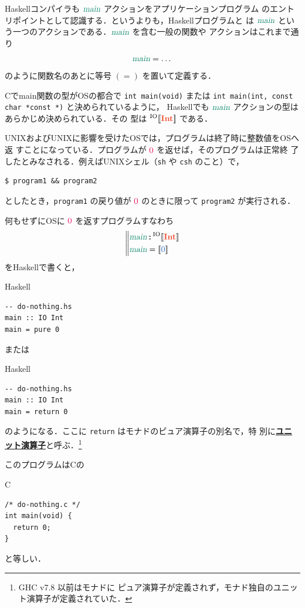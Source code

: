 \documentclass[a5paper,twoside,fleqn,draft]{jsbook}
\def\[{[\![}
\def\]{]\!]}
\def\constantColor{WildStrawberry}
\def\varColor{NavyBlue}
\def\actionColor{PineGreen}
\def\typeColor{RedOrange}
\newcommand{\programminglanguage}[1]{\textsf{#1}}
\newcommand{\clang}{\programminglanguage{C}}
\newcommand{\haskell}{\programminglanguage{Haskell}}
\newcommand{\keyword}[1]{{\underline{\textbf{#1}}}}
\newcommand{\code}[1]{\texttt{#1}}
\newcommand{\filename}[1]{\texttt{#1}}
\newenvironment{ccode}{\begin{itembox}[r]{\clang}}{\end{itembox}}
\newenvironment{haskellcode}{\begin{itembox}[r]{\haskell}}{\end{itembox}}
\newcommand{\mBrace}{\Vert}
\newcommand{\mConstant}[1]{\textcolor{\constantColor}{#1}}
\newcommand{\mZeroNumber}{{\mConstant{0}}}
\newcommand{\mVar}[1]{\textcolor{\varColor}{#1}}
\newcommand{\mActionLong}[1]{\textcolor{\actionColor}{\textsl{#1}}}
\DeclareMathOperator{\mMain}{\mActionLong{main}}
\DeclareMathOperator{\mIn}{{:\!:}}
\newcommand{\mType}[1]{\textcolor{\typeColor}{\mathbf{#1}}}
\newcommand{\mIntType}{\mType{Int}}
\newcommand{\mTypeAssemble}[2]{{}^\mathrm{#1}\[\mType{#2}\]}
\newcommand{\mIOType}[1]{\mTypeAssemble{IO}{#1}}
\newcommand{\mIOIntType}{\mIOType{\mIntType}}
\newcommand{\mPureWith}[1]{\[\mVar{#1}\]}
\begin{document}
\haskell コンパイラも $\mMain$ アクションをアプリケーションプログラム
のエントリポイントとして認識する．というよりも，\haskell プログラムと
は $\mMain$ という一つのアクションである．$\mMain$ を含む一般の関数や
アクションはこれまで通り
\begin{equation}
\mMain=\dots
\end{equation}
のように関数名のあとに等号 $(=)$ を置いて定義する．

\clang でmain関数の型がOSの都合で \code{int main(void)} または
\code{int main(int, const char *const *)} と決められているように，
\haskell でも $\mMain$ アクションの型はあらかじめ決められている．その
型は $\mIOIntType$ である．

UNIXおよびUNIXに影響を受けたOSでは，プログラムは終了時に整数値をOSへ返
すことになっている．プログラムが $\mZeroNumber$ を返せば，そのプログラムは正常終
了したとみなされる．例えばUNIXシェル（\filename{sh} や \filename{csh}
  のこと）で，
\begin{verbatim}
$ program1 && program2
\end{verbatim}
としたとき，\filename{program1} の戻り値が $\mZeroNumber$ のときに限って
\filename{program2} が実行される．

何もせずにOSに $\mZeroNumber$ を返すプログラムすなわち
\begin{equation}
\left\mBrace
\begin{aligned}
\mMain&\mIn{}\mIOIntType\\
\mMain&=\mPureWith{0}
\end{aligned}
\right.
\end{equation}
を\haskell で書くと，
\begin{haskellcode}
\begin{verbatim}
-- do-nothing.hs
main :: IO Int
main = pure 0
\end{verbatim}
\end{haskellcode}
または
\begin{haskellcode}
\begin{verbatim}
-- do-nothing.hs
main :: IO Int
main = return 0
\end{verbatim}
\end{haskellcode}
のようになる．ここに \code{return} はモナドのピュア演算子の別名で，特
別に\keyword{ユニット演算子}と呼ぶ．\footnote{GHC v7.8 以前はモナドに
  ピュア演算子が定義されず，モナド独自のユニット演算子が定義されていた．}

このプログラムは\clang の
\begin{ccode}
\begin{verbatim}
/* do-nothing.c */
int main(void) {
  return 0;
}
\end{verbatim}
\end{ccode}
と等しい．
\end{document}
